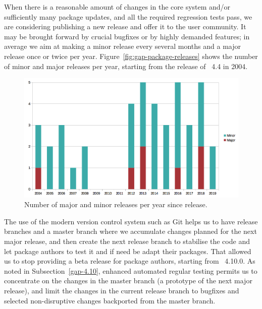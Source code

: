 
When there is a reasonable amount of changes in the core \GAP system
and/or sufficiently many package updates, and all the required
regression tests pass, we are considering publishing a new \GAP release
and offer it to the user community. It may be 
brought forward by crucial bugfixes or by highly demanded features;
in average we aim at making a minor release every several months 
and a major release once or twice per year. 
Figure~\ref{fig:gap-package-releases} shows the number of minor
and major \GAP releases per year, starting from the release of
\GAP~4.4 in 2004.

\begin{figure}[!ht]
    \centering
    \includegraphics[width=\textwidth]{images/gap-releases}
    \caption{Number of major and minor \GAP releases per year since  release.}
    \label{fig:gap-releases}
\end{figure}

The use of the modern version control system such as {\sf Git}
helps us to have release branches and a master branch
where we accumulate changes planned for the next major release, and then
create the next release branch to stabilise the code and let package
authors to test it and if need be adapt their packages. That allowed
us to stop providing a beta release for package authors, starting from
\GAP~4.10.0. As noted in Subsection~\ref{gap-4.10},
enhanced automated regular testing permits us to concentrate on 
the changes in the master branch (a prototype of the next major release), and limit 
the changes in the current release branch to bugfixes and selected 
non-disruptive changes backported from the master branch.

